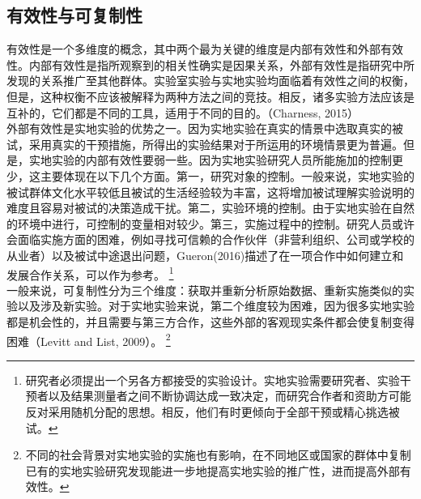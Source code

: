 \documentclass[a4paper]{article}
\begin{document}
	\subsection{有效性与可复制性}
	有效性是一个多维度的概念，其中两个最为关键的维度是内部有效性和外部有效性。内部有效性是指所观察到的相关性确实是因果关系，外部有效性是指研究中所发现的关系推广至其他群体。实验室实验与实地实验均面临着有效性之间的权衡，但是，这种权衡不应该被解释为两种方法之间的竞技。相反，诸多实验方法应该是互补的，它们都是不同的工具，适用于不同的目的。（Charness, 2015）
	\\[3pt]
	\indent
	外部有效性是实地实验的优势之一。因为实地实验在真实的情景中选取真实的被试，采用真实的干预措施，所得出的实验结果对于所运用的环境情景更为普遍。但是，实地实验的内部有效性要弱一些。因为实地实验研究人员所能施加的控制更少，这主要体现在以下几个方面。第一，研究对象的控制。一般来说，实地实验的被试群体文化水平较低且被试的生活经验较为丰富，这将增加被试理解实验说明的难度且容易对被试的决策造成干扰。第二，实验环境的控制。由于实地实验在自然的环境中进行，可控制的变量相对较少。第三，实施过程中的控制。研究人员或许会面临实施方面的困难，例如寻找可信赖的合作伙伴（非营利组织、公司或学校的从业者）以及被试中途退出问题，Gueron(2016)描述了在一项合作中如何建立和发展合作关系，可以作为参考。
	\footnote{研究者必须提出一个另各方都接受的实验设计。实地实验需要研究者、实验干预者以及结果测量者之间不断协调达成一致决定，而研究合作者和资助方可能反对采用随机分配的思想。相反，他们有时更倾向于全部干预或精心挑选被试。}
	\\[3pt]
	\indent
	一般来说，可复制性分为三个维度：获取并重新分析原始数据、重新实施类似的实验以及涉及新实验。对于实地实验来说，第二个维度较为困难，因为很多实地实验都是机会性的，并且需要与第三方合作，这些外部的客观现实条件都会使复制变得困难（Levitt and List, 2009）。
	\footnote{不同的社会背景对实地实验的实施也有影响，在不同地区或国家的群体中复制已有的实地实验研究发现能进一步地提高实地实验的推广性，进而提高外部有效性。}
	
\end{document}
